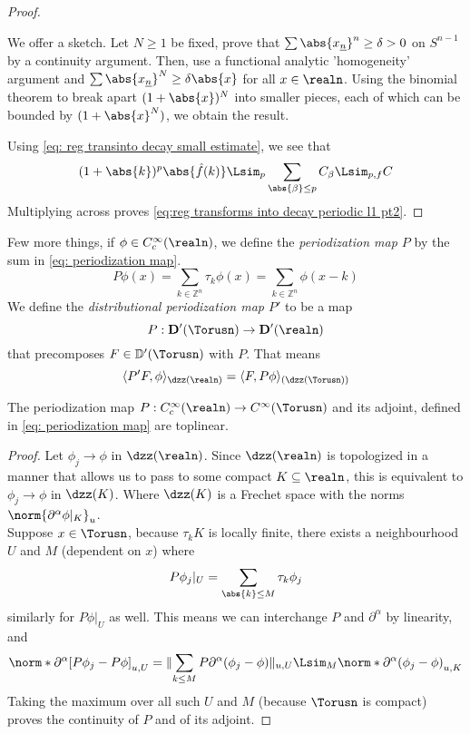 \documentclass[../main-v2-manifolds.tex]{subfiles}
\begin{document}
\begin{proof}
    \begin{note}
        We offer a sketch. Let $N\geq 1$ be fixed, prove that $\sum \abs{x_{\underline{n}}}^n\geq \delta> 0$ on $S^{n-1}$ by a continuity argument. Then, use a functional analytic 'homogeneity' argument and $\sum \abs{x_{\underline{n}}}^N \geq \delta\abs{x}$ for all $x\in\realn$. Using the binomial theorem to break apart $(1+\abs{x})^N$ into smaller pieces, each of which can be bounded by $(1+\abs{x}^N)$, we obtain the result.
    \end{note}
    Using \cref{eq: reg transinto decay small estimate}, we see that
    \[
        (1+\abs{k})^p\abs{\hat{f}(k)}\Lsim_p\sum_{\abs{\beta}\leq p}C_{\beta}\Lsim_{p,f} C
    \]
    Multiplying across proves \cref{eq:reg transforms into decay periodic l1 pt2}.
\end{proof}
Few more things, if $\phi\in C_c^\infty(\realn)$, we define the \emph{periodization map $P$} by the sum in \cref{eq: periodization map}. 
\begin{equation}
P\phi(x) = \sum_{k\in\mathbb{Z}^n}\tau_k\phi(x) = \sum_{k\in\mathbb{Z}^n}\phi(x-k)
\label{eq: periodization map}
\end{equation}
We define the \emph{distributional periodization map $P'$} to be a map
\[
P: \mathbf{D}'(\Torusn)\to \mathbf{D}'(\realn)
\]
that precomposes $F\in \mathbb{D}'(\Torusn)$ with $P$. That means
\[
\langle P'F,\phi \rangle_{\dzz(\realn)} = \langle F, P\phi\rangle_{(\dzz(\Torusn))}
\]
\begin{wts}\label{thm: exercise 9.22 Folland Periodization}
    The periodization map $P: C_c^\infty(\realn)\to C^\infty(\Torusn)$ and its adjoint, defined in \cref{eq: periodization map} are toplinear.
\end{wts}
\begin{proof}
    Let $\phi_j\to \phi$ in $\dzz(\realn)$. Since $\dzz(\realn)$ is topologized in a manner that allows us to pass to some compact $K\subseteq\realn$, this is equivalent to $\phi_j\to \phi$ in $\dzz(K)$. Where $\dzz(K)$ is a Frechet space with the norms $\norm{\partial^\alpha \phi\vert_{K}}_u$. \\

    Suppose $x\in \Torusn$, because $\tau_k K$ is locally finite, there exists a neighbourhood $U$ and $M$ (dependent on $x$) where
    \[
        P\phi_j\vert_{U} = \sum_{\abs{k}\leq M} \tau_k\phi_j
    \]
    similarly for $P\phi\vert_U$ as well. This means we can interchange $P$  and $\partial^\alpha$ by linearity, and 
    \[
        \norm*{\partial^\alpha[P\phi_j - P\phi]}_{u,U} = \lVert\sum_{k\leq M} P\partial^\alpha (\phi_j - \phi)\rVert_{u,U}\Lsim_M \norm*{\partial^\alpha(\phi_j - \phi)}_{u,K}
    \]
    Taking the maximum over all such $U$ and $M$ (because $\Torusn$ is compact) proves the continuity of $P$ and of its adjoint. 
\end{proof}
\end{document}
